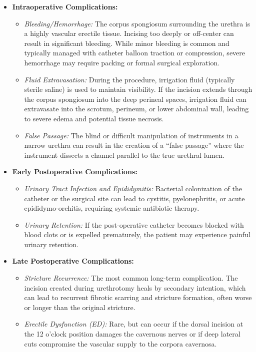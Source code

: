 \begin{itemize}
  \item \textbf{Intraoperative Complications:}
  \begin{itemize}
    \item \textit{Bleeding/Hemorrhage:} The corpus spongiosum surrounding the urethra is a highly vascular erectile tissue. Incising too deeply or off-center can result in significant bleeding. While minor bleeding is common and typically managed with catheter balloon traction or compression, severe hemorrhage may require packing or formal surgical exploration.
    \item \textit{Fluid Extravasation:} During the procedure, irrigation fluid (typically sterile saline) is used to maintain visibility. If the incision extends through the corpus spongiosum into the deep perineal spaces, irrigation fluid can extravasate into the scrotum, perineum, or lower abdominal wall, leading to severe edema and potential tissue necrosis.
    \item \textit{False Passage:} The blind or difficult manipulation of instruments in a narrow urethra can result in the creation of a ``false passage'' where the instrument dissects a channel parallel to the true urethral lumen.
  \end{itemize}
  \item \textbf{Early Postoperative Complications:}
  \begin{itemize}
    \item \textit{Urinary Tract Infection and Epididymitis:} Bacterial colonization of the catheter or the surgical site can lead to cystitis, pyelonephritis, or acute epididymo-orchitis, requiring systemic antibiotic therapy.
    \item \textit{Urinary Retention:} If the post-operative catheter becomes blocked with blood clots or is expelled prematurely, the patient may experience painful urinary retention.
  \end{itemize}
  \item \textbf{Late Postoperative Complications:}
  \begin{itemize}
    \item \textit{Stricture Recurrence:} The most common long-term complication. The incision created during urethrotomy heals by secondary intention, which can lead to recurrent fibrotic scarring and stricture formation, often worse or longer than the original stricture.
    \item \textit{Erectile Dysfunction (ED):} Rare, but can occur if the dorsal incision at the 12 o'clock position damages the cavernous nerves or if deep lateral cuts compromise the vascular supply to the corpora cavernosa.

\end{itemize}
\end{itemize}
